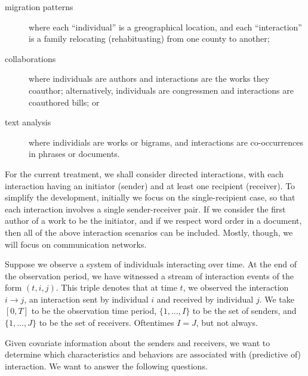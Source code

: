 \documentclass[aoas,preprint]{imsart}
\begin{document}
\begin{description}

    \item[migration patterns] where each ``individual'' is a greographical
    location, and each ``interaction'' is a family relocating (rehabituating)
    from one county to another;

    \item[collaborations] where individuals are authors and interactions are
    the works they coauthor; alternatively, individuals are congressmen and
    interactions are coauthored bills; or

    \item[text analysis] where individials are works or bigrams, and
    interactions are co-occurrences in phrases or documents.

\end{description}

For the current treatment, we shall consider directed interactions, with each
interaction having an initiator (sender) and at least one recipient
(receiver). To simplify the development, initially we focus on the
single-recipient case, so that each interaction involves a single
sender-receiver pair. If we consider the first author of a work to be the
initiator, and if we respect word order in a document, then all of the above
interaction scenarios can be included. Mostly, though, we will focus on
communication networks.

Suppose we observe a system of individuals interacting over time. At the end
of the observation period, we have witnessed a stream of interaction events of
the form $(t, i, j)$. This triple denotes that at time $t$, we observed the
interaction $i \to j$, an interaction sent by individual $i$ and received by
individual $j$. We take $[0,T]$ to be the observation time period, $\{1,
\ldots, I \}$ to be the set of senders, and $\{1, \ldots, J \}$ to be the set
of receivers. Oftentimes $I = J$, but not always.

Given covariate information about the senders and receivers, we want to
determine which characteristics and behaviors are associated with (predictive
of) interaction. We want to answer the following questions.
\end{document}
